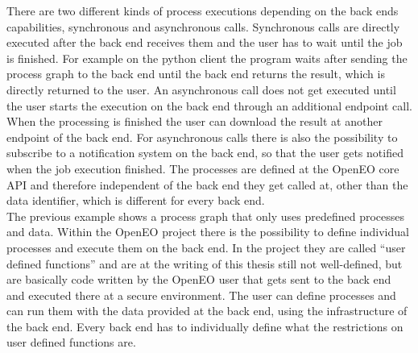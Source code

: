 \documentclass[draft,final]{vutinfth} %
\begin{document}
There are two different kinds of process executions depending on the back ends capabilities, synchronous and asynchronous calls. Synchronous calls are directly executed after the back end receives them and the user has to wait until the job is finished. For example on the python client the program waits after sending the process graph to the back end until the back end returns the result, which is directly returned to the user. An asynchronous call does not get executed until the user starts the execution on the back end through an additional endpoint call. When the processing is finished the user can download the result at another endpoint of the back end. For asynchronous calls there is also the possibility to subscribe to a notification system on the back end, so that the user gets notified when the job execution finished.     
The processes are defined at the OpenEO core API and therefore independent of the back end they get called at, other than the data identifier, which is different for every back end.  
\\
The previous example shows a process graph that only uses predefined processes and data. Within the OpenEO project there is the possibility to define individual processes and execute them on the back end. In the project they are called “user defined functions” and are at the writing of this thesis still not well-defined, but are basically code written by the OpenEO user that gets sent to the back end and executed there at a secure environment. The user can define processes and can run them with the data provided at the back end, using the infrastructure of the back end. Every back end has to individually define what the restrictions on user defined functions are. \cite{eodc_github}
\end{document}
